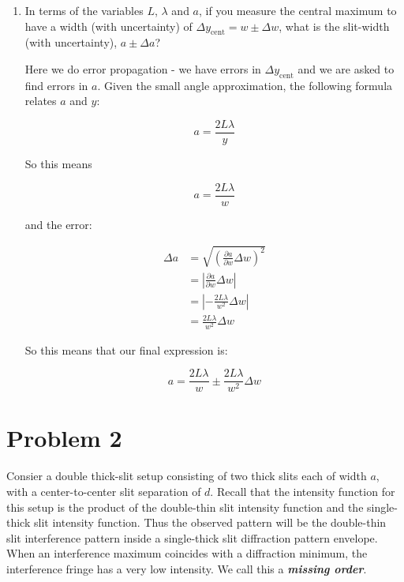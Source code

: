 \documentclass[10pt]{article}
\begin{document}
    \begin{enumerate}[resume, label=\alph*)]
        \item In terms of the variables $L$, $\lambda$ and $a$, if you measure the central maximum to have a width (with uncertainty) of $\Delta y_{\text{cent}} = w \pm \Delta w$, what is the slit-width (with uncertainty), $a \pm \Delta a$?
        
        \begin{solution}
           Here we do error propagation - we have errors in $\Delta y_{\text{cent}}$ and we are asked to find errors in $a$. Given the small angle approximation, the following formula relates $a$ and $y$:

           \[ a = \frac{2L\lambda}{y}\]

           So this means

           \[ a = \frac{2L\lambda}{w}\]

           and the error:

           \begin{align*}
            \Delta a &= \sqrt{\left(\frac{\partial a}{\partial w} \Delta w\right)^2}\\
            &= \left|\frac{\partial a}{\partial w} \Delta w\right|\\
            &= \left|-\frac{2L\lambda}{w^2}\Delta w\right|\\
            &= \frac{2L\lambda}{w^2}\Delta w
           \end{align*}




           So this means that our final expression is:

           \[ a = \frac{2L\lambda}{w} \pm \frac{2L\lambda}{w^2}\Delta w\]
           
        \end{solution}
    \end{enumerate}

    \pagebreak

    \section*{Problem 2} 

    Consier a double thick-slit setup consisting of two thick slits each of width $a$, with a center-to-center slit separation of $d$. Recall that the intensity function for this setup is the product of the double-thin slit intensity function and the single-thick slit intensity function. Thus the observed pattern will be the double-thin slit interference pattern inside a single-thick slit diffraction pattern envelope. When an interference maximum coincides with a diffraction minimum, the interference fringe has a very low intensity. We call this a \textit{\textbf{missing order}}. 
\end{document}
